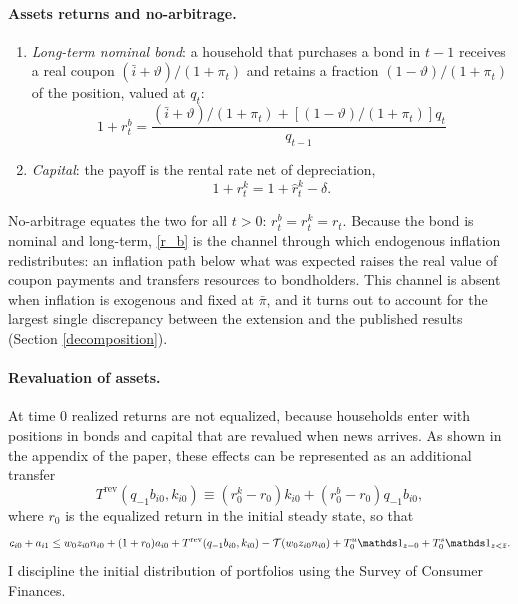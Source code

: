 \paragraph{Assets returns and no-arbitrage.}
\begin{enumerate}
    \item \textit{Long-term nominal bond}: a household that purchases a bond in
    $t-1$ receives a real coupon $(\bar i+\vartheta)/(1+\pi_t)$ and retains a
    fraction $(1-\vartheta)/(1+\pi_t)$ of the position, valued at $q_t$:
    \begin{equation}\label{r_b}
        1 + r_{t}^b = \frac{ (\bar{i} + \vartheta)/(1+\pi_{t}) + [(1-\vartheta)/(1+\pi_{t})] q_{t}}{q_{t-1}}
    \end{equation}
    \item \textit{Capital}: the payoff is the rental rate net of depreciation,
    \begin{equation}
        1 + r_{t}^k = 1 + \hat{r}_t^k - \delta .
    \end{equation}
\end{enumerate}
No-arbitrage equates the two for all $t>0$: $r^b_t=r^k_t=r_t$. Because the bond
is nominal and long-term, \eqref{r_b} is the channel through which endogenous
inflation redistributes: an inflation path below what was expected raises the
real value of coupon payments and transfers resources to bondholders. This
channel is absent when inflation is exogenous and fixed at $\bar\pi$, and it
turns out to account for the largest single discrepancy between the extension
and the published results (Section \ref{decomposition}).

\paragraph{Revaluation of assets.} At time $0$ realized returns are not
equalized, because households enter with positions in bonds and capital that are
revalued when news arrives. As shown in the appendix of the paper, these effects
can be represented as an additional transfer
\[
T^{\text{rev}}(q_{-1}b_{i0}, k_{i0}) \equiv (r_0^k - r_0) k_{i0} + (r_0^b - r_0) q_{-1} b_{i0},
\]
where $r_0$ is the equalized return in the initial steady state, so that
\begin{equation*}
    c_{i0} + a_{i1}\leq  w_0 z_{i0} n_{i0} + (1+r_0) a_{i0} + T^{\text{rev}}(q_{-1}b_{i0}, k_{i0})- \mathcal{T}(w_{0} z_{i0} n_{i0}) + T_{0}^u \Ind_{z=0} + T^s_{0} \Ind_{z<\bar z}.
\end{equation*}
I discipline the initial distribution of portfolios using the Survey of Consumer
Finances.

